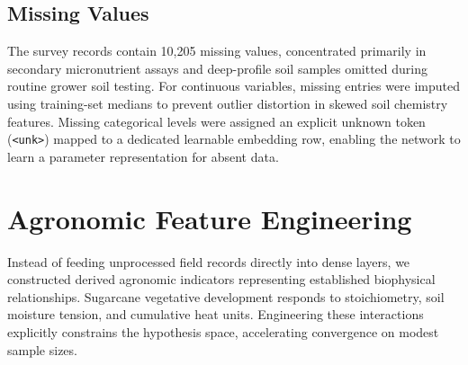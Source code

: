 \documentclass[conference,10pt,letterpaper]{IEEEtran}
\begin{document}
\subsection{Missing Values}
The survey records contain 10,205 missing values, concentrated primarily in secondary micronutrient assays and deep-profile soil samples omitted during routine grower soil testing. For continuous variables, missing entries were imputed using training-set medians to prevent outlier distortion in skewed soil chemistry features. Missing categorical levels were assigned an explicit unknown token (\texttt{<unk>}) mapped to a dedicated learnable embedding row, enabling the network to learn a parameter representation for absent data.

\section{Agronomic Feature Engineering}

Instead of feeding unprocessed field records directly into dense layers, we constructed derived agronomic indicators representing established biophysical relationships. Sugarcane vegetative development responds to stoichiometry, soil moisture tension, and cumulative heat units. Engineering these interactions explicitly constrains the hypothesis space, accelerating convergence on modest sample sizes.
\end{document}
